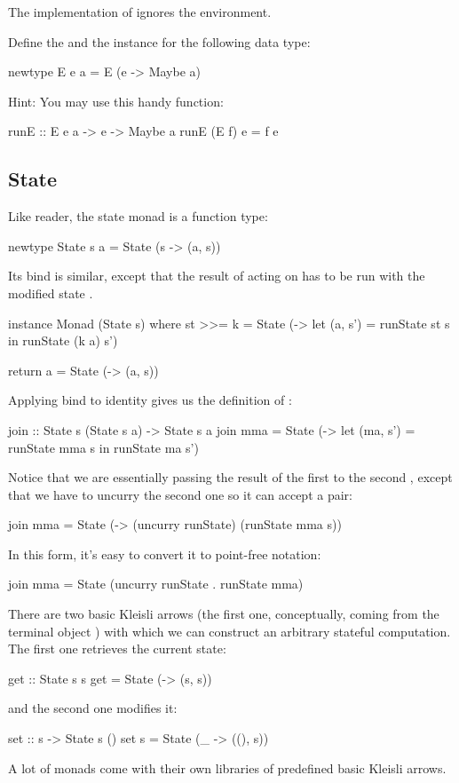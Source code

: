 \documentclass[DaoFP]{subfiles}
\begin{document}
The implementation of  ignores the environment.

\begin{exercise}
Define the  and the  instance for the following data type:
\begin{haskell}
newtype E e a = E (e -> Maybe a)
\end{haskell}
Hint: You may use this handy function:
\begin{haskell}
runE :: E e a -> e -> Maybe a
runE (E f) e = f e
\end{haskell}
\end{exercise}


\subsection{State}
Like reader, the state monad is a function type:
\begin{haskell}
newtype State s a = State (s -> (a, s))
\end{haskell}
Its bind is similar, except that the result of  acting on   has to be run with the modified state .
\begin{haskell}
instance Monad (State s) where
  st >>= k = State (\s -> let (a, s') = runState st s
                          in runState (k a) s')
                          
  return a = State (\s -> (a, s))
\end{haskell}

Applying bind to identity gives us the definition of :
\begin{haskell}
join :: State s (State s a) -> State s a
join mma = State (\s -> let (ma, s') = runState mma s
                        in runState ma s')
\end{haskell}
Notice that we are essentially passing the result of the first  to the second , except that we have to uncurry the second one so it can accept a pair:
                             
\begin{haskell}
join mma = State (\s -> (uncurry runState) (runState mma s))
\end{haskell}
In this form, it's easy to convert it to point-free notation:
\begin{haskell}
join mma = State (uncurry runState . runState mma)
\end{haskell}

There are two basic Kleisli arrows (the first one, conceptually, coming from the terminal object \hask{()}) with which we can construct an arbitrary stateful computation. The first one retrieves the current state:
\begin{haskell}
get :: State s s
get = State (\s -> (s, s))
\end{haskell}
and the second one modifies it:
\begin{haskell}
set :: s -> State s ()
set s = State (\_ -> ((), s))
\end{haskell}
A lot of monads come with their own libraries of predefined basic Kleisli arrows.
\end{document}
